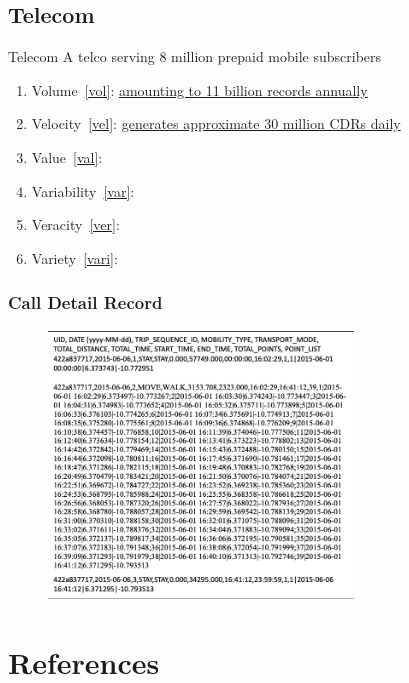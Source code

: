 \documentclass[pdf]{beamer}
\begin{document}
\subsection{Telecom}
\begin{frame}[allowframebreaks, label={iv1}]{Telecom}
A telco\cite{vtata} serving 8 million prepaid mobile subscribers
\begin{enumerate}
	\item Volume~\ref{vol}: \underline{amounting to 11 billion records annually}
	\item Velocity~\ref{vel}:  \underline{generates approximate 30 million CDR\cite{cdr}s daily}
	\item Value~\ref{val}: \underline{\hspace{3cm}}
	\item Variability~\ref{var}: \underline{\hspace{3cm}}
	\item Veracity~\ref{ver}:  \underline{\hspace{3cm}}
	\item Variety~\ref{vari}:  \underline{\hspace{3cm}}
\end{enumerate}
\end{frame}

\subsubsection{Call Detail Record}
\begin{frame}[fragile]{}
\begin{figure}[ht]
	    \begin{center}
        		\includegraphics[height=2.8in]{cdr.png}
    \end{center}
    \end{figure}
\end{frame}





\section{References}
 

\end{document}
